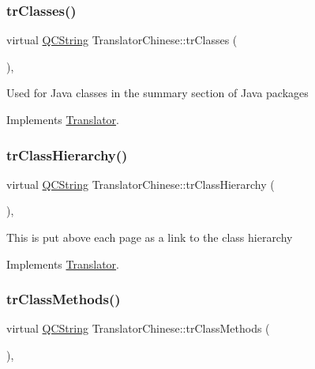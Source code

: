 \subsubsection{\texorpdfstring{trClasses()}{trClasses()}}
{\footnotesize\ttfamily virtual \mbox{\hyperlink{class_q_c_string}{Q\+C\+String}} Translator\+Chinese\+::tr\+Classes (\begin{DoxyParamCaption}{ }\end{DoxyParamCaption})\hspace{0.3cm}{\ttfamily [inline]}, {\ttfamily [virtual]}}

Used for Java classes in the summary section of Java packages 

Implements \mbox{\hyperlink{class_translator}{Translator}}.

\mbox{\label{class_translator_chinese_ac5f4e458b25badfddf335090ae3c23ed}} 
\subsubsection{\texorpdfstring{trClassHierarchy()}{trClassHierarchy()}}
{\footnotesize\ttfamily virtual \mbox{\hyperlink{class_q_c_string}{Q\+C\+String}} Translator\+Chinese\+::tr\+Class\+Hierarchy (\begin{DoxyParamCaption}{ }\end{DoxyParamCaption})\hspace{0.3cm}{\ttfamily [inline]}, {\ttfamily [virtual]}}

This is put above each page as a link to the class hierarchy 

Implements \mbox{\hyperlink{class_translator}{Translator}}.

\mbox{\label{class_translator_chinese_a2b81bbee1f1b49666e5695cdd26dcfdd}} 
\subsubsection{\texorpdfstring{trClassMethods()}{trClassMethods()}}
{\footnotesize\ttfamily virtual \mbox{\hyperlink{class_q_c_string}{Q\+C\+String}} Translator\+Chinese\+::tr\+Class\+Methods (\begin{DoxyParamCaption}{ }\end{DoxyParamCaption})\hspace{0.3cm}{\ttfamily [inline]}, {\ttfamily [virtual]}}

